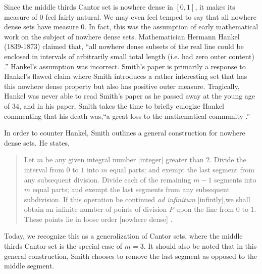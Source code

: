 \documentclass{article}
\theoremstyle{axiom} \newtheorem{axiom}{Axiom}
\theoremstyle{definition} \newtheorem{definition}{Definition}
\theoremstyle{example} \newtheorem{example}{Example}
\theoremstyle{proposition} \newtheorem{prop}{Proposition}
\theoremstyle{lemma} \newtheorem{lemma}{Lemma}
\begin{document}
Since the middle thirds Cantor set is nowhere dense in $[0,1]$, it makes its measure of $0$ feel 
fairly natural. We may even feel temped to say that all nowhere dense sets have
measure $0$. In fact, this was the assumption of early mathematical work on the
subject of nowhere dense sets. Mathematician Hermann Hankel (1839-1873) claimed 
that, ``all nowhere dense subsets of the real line could be enclosed in
intervals of arbitrarily small total length (i.e. had zero outer content) 
\cite{fleron:1994}.'' Hankel's assumption was incorrect. Smith's paper is primarily a
response to Hankel's flawed claim where Smith introduces a rather interesting set that has this nowhere 
dense property but also has positive outer measure. Tragically, Hankel was never able
to read Smith's paper as he passed away at the young age of 34, and in his
paper, Smith takes the time to briefly eulogize Hankel commenting that his death 
was,``a great loss to the mathematical community \cite{smith:1875}.''

In order to counter Hankel, Smith outlines a general construction for nowhere dense 
sets. He states,
\begin{quote}
	Let $m$ be any given integral number [integer] greater than $2$. 
	Divide the interval from $0$ to $1$ into $m$ equal parts; and exempt the last
	segment from any subsequent division. Divide each of the remaining $m-1$
	segments into $m$ equal parts; and exempt the last segments from any
	subsequent subdivision. If this operation be continued \textit{ad
	infinitum} [infintly],we shall obtain an infinite number of points of division $P$
	upon the line from $0$ to $1$. These points lie in loose order [nowhere
	dense] \cite{smith:1875}.
\end{quote}
Today, we recognize this as a generalization of Cantor sets, where the middle
thirds Cantor set is the special case of $m=3$. It should also be noted that
in this general construction, Smith chooses to remove the last segment as
opposed to the middle segment. 
\end{document}
